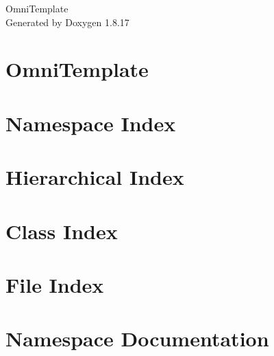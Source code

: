 \let\mypdfximage\pdfximage\def\pdfximage{\immediate\mypdfximage}\documentclass[twoside]{book}
\newcommand{\+}{\discretionary{\mbox{\scriptsize$\hookleftarrow$}}{}{}}
\newcommand{\clearemptydoublepage}{%
  \newpage{\pagestyle{empty}\cleardoublepage}%
}
\begin{document}
\hypersetup{pageanchor=false,
             bookmarksnumbered=true,
             pdfencoding=unicode
            }
\begin{titlepage}
\vspace*{7cm}
\begin{center}%
{\Large Omni\+Template }\\
\vspace*{1cm}
{\large Generated by Doxygen 1.8.17}\\
\end{center}
\end{titlepage}
\clearemptydoublepage
{}
\tableofcontents
\clearemptydoublepage
{}
\hypersetup{pageanchor=true}

\chapter{Omni\+Template}
\label{md__home_ram_OmniTemplate_README}

\chapter{Namespace Index}

\chapter{Hierarchical Index}

\chapter{Class Index}

\chapter{File Index}

\chapter{Namespace Documentation}
















\end{document}
